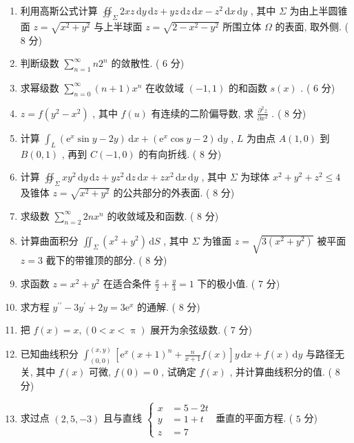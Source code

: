 \documentclass[cn,11pt,fancy,hide]{elegantbook}
\newcommand{\ee}{\mathrm{e}}
\newcommand{\dd}{\,\mathrm{d}}
\renewcommand{\leq}{\leqslant}
\begin{document}
\begin{enumerate}
	\item 利用高斯公式计算 $\oiint_{\Sigma} 2 x z \dd y \dd z+y z \dd z \dd x-z^{2} \dd x \dd y$ , 其中 $\Sigma$ 为由上半圆锥面 $z=\sqrt{x^{2}+y^{2}}$ 与上半球面 $z=\sqrt{2-x^{2}-y^{2}}$ 所围立体 $\Omega$ 的表面, 取外侧. ( $8$ 分)
	
	\item  判断级数 $\sum_{n=1}^{\infty} n 2^{n}$ 的敛散性. ( $6$ 分)
	
	\item  求幂级数 $\sum_{n=0}^{\infty}(n+1) x^{n}$ 在收敛域 $(-1,1)$ 的和函数 $s(x)$ . ( $6$ 分)
	
	\item $z=f\left(y^{2}-x^{2}\right)$ , 其中 $f(u)$ 有连续的二阶偏导数, 求 $\frac{\partial^{2} z}{\partial x^{2}}$ . ( $8$ 分)
	
	\item 计算 $\int_{L}\left(\ee^{x} \sin y-2 y\right) \dd x+\left(\ee^{x} \cos y-2\right) \dd y$ , $L$ 为由点 $A(1,0)$ 到 $B(0,1)$ , 再到 $C(-1,0)$ 的有向折线. ( $8$ 分)
	
	\item 计算 $\oiint_{\Sigma} x y^{2} \dd y \dd z+y z^{2} \dd z \dd x+z x^{2} \dd x \dd y$ , 其中 $\Sigma$ 为球体 $x^{2}+y^{2}+z^{2} \leq 4$ 及锥体 $z=\sqrt{x^{2}+y^{2}}$ 的公共部分的外表面. ( $8$ 分)
	
	\item 求级数 $\sum_{n=2}^{\infty} 2 n x^{n}$ 的收敛域及和函数. ( $8$ 分)
	
	\item 计算曲面积分 $\iint_{\Sigma}\left(x^{2}+y^{2}\right) \dd S$ , 其中 $\Sigma$ 为锥面 $z=\sqrt{3\left(x^2+y^2\right)}$ 被平面 $z=3$ 截下的带锥顶的部分. ( $8$ 分)
	
	\item 求函数 $z=x^2+y^2$ 在适合条件 $\frac{x}{2}+\frac{y}{3}=1$ 下的极小值. ( $7$ 分)
	
	\item 求方程 $y^{\prime \prime}-3 y^{\prime}+2 y=3 \ee^{x}$ 的通解. ( $8$ 分)
	
	\item 把 $f(x)=x,(0<x<\uppi)$ 展开为余弦级数. ( $7$ 分)
	
	\item 已知曲线积分 $\int_{(0,0)}^{(x, y)}\left[\ee^{x}(x+1)^{n}+\frac{n}{x+1} f(x)\right] y \dd x+f(x) \dd y$ 与路径无关, 其中 $f(x)$ 可微, $f(0)=0$ , 试确定 $f(x)$ , 并计算曲线积分的值. ( $8$ 分)
	
	\item 求过点 $(2,5,-3)$ 且与直线 $\begin{cases}
	x&=5-2t\\
	y&=1+t\\
	z&=7
	\end{cases}$ 垂直的平面方程. ( $5$ 分)
	

\end{enumerate}
\end{document}
